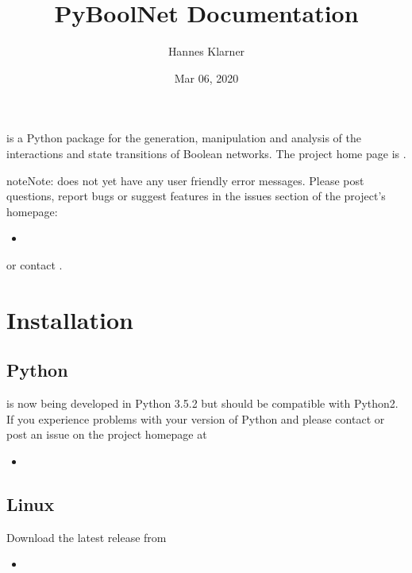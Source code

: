 \documentclass[letterpaper,10pt,english]{sphinxmanual}
\title{PyBoolNet Documentation}
\date{Mar 06, 2020}
\author{Hannes Klarner}
\begin{document}
\maketitle
\sphinxtableofcontents
{}\label{\detokenize{index::doc}}
 is a Python package for the generation, manipulation and analysis of the interactions and state transitions of Boolean networks.
The project home page is .

\begin{sphinxadmonition}{note}{Note:}
 does not yet have any user friendly error messages.
Please post questions, report bugs or suggest features in the issues section of the project’s homepage:
\begin{itemize}
\item {} 

\end{itemize}

or contact .
\end{sphinxadmonition}




\chapter{Installation}
\label{\detokenize{Installation:installation}}\label{\detokenize{Installation:id1}}\label{\detokenize{Installation::doc}}\label{\detokenize{Installation:installation-software}}

\section{Python}
\label{\detokenize{Installation:python}}
 is now being developed in Python 3.5.2 but should be compatible with Python2.
If you experience problems with your version of Python and  please contact  or
post an issue on the project homepage at
\begin{itemize}
\item {} 

\end{itemize}


\section{Linux}
\label{\detokenize{Installation:linux}}
Download the latest release from
\begin{itemize}
\item {} 

\end{itemize}
\end{document}
